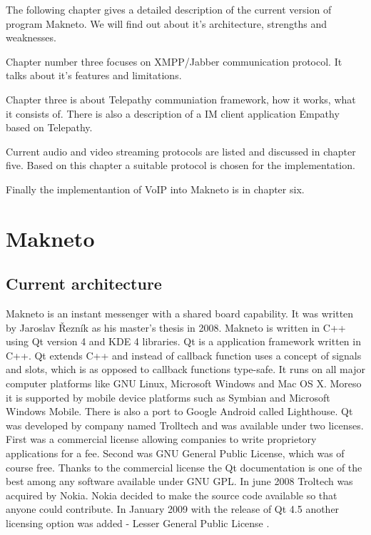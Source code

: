 The following chapter gives a detailed description of the current version of program Makneto. We will find out about it's architecture, strengths and weaknesses. 

Chapter number three focuses on XMPP/Jabber communication protocol. It talks about it's features and limitations. 

Chapter three is about Telepathy communiation framework, how it works, what it consists of. There is also a description of a IM client application Empathy based on Telepathy. 

Current audio and video streaming protocols are listed and discussed in chapter five. Based on this chapter a suitable protocol is chosen for the implementation.

Finally the implementantion of VoIP into Makneto is in chapter six.  


\chapter{Makneto}
\section{Current architecture}
Makneto is an instant messenger with a shared board capability. It was written by Jaroslav Řezník as his master's thesis in 2008. Makneto is written in C++ using Qt version 4 and KDE 4 libraries. Qt is a application framework written in C++. Qt extends C++ and instead of callback function uses a concept of signals and slots, which is as opposed to callback functions type-safe. It runs on all major computer platforms like GNU Linux, Microsoft Windows and Mac OS X. Moreso it is supported by mobile device platforms such as Symbian and Microsoft Windows Mobile. There is also a port to Google Android called Lighthouse. Qt was developed by company named Trolltech and was available under two licenses. First was a commercial license allowing companies to write proprietory applications for a fee. Second was GNU General Public License, which was of course free. Thanks to the commercial license the Qt documentation is one of the best among any software available under GNU GPL. In june 2008 Troltech was acquired by Nokia. Nokia decided to make the source code available so that anyone could contribute. In January 2009 with the release of Qt 4.5 another licensing option was added - Lesser General Public License \cite{qtBook,Qt}.

